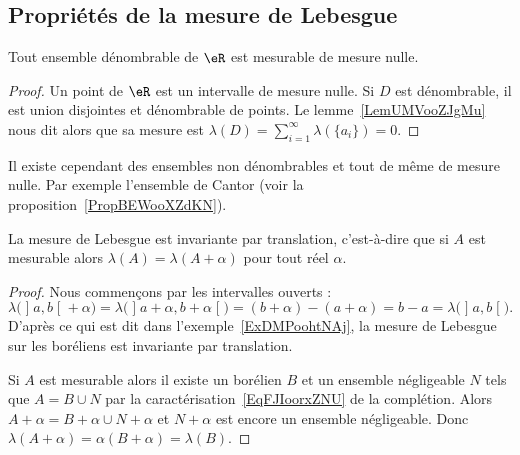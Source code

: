\subsection{Propriétés de la mesure de Lebesgue}

\begin{proposition}
    Tout ensemble dénombrable de \( \eR\) est mesurable de mesure nulle.
\end{proposition}

\begin{proof}
    Un point de \( \eR\) est un intervalle de mesure nulle. Si \( D\) est dénombrable, il est union disjointes et dénombrable de points. Le lemme~\ref{LemUMVooZJgMu} nous dit alors que sa mesure est \( \lambda(D)=\sum_{i=1}^{\infty}\lambda(\{ a_i \})=0\).
\end{proof}

\begin{remark}
    Il existe cependant des ensembles non dénombrables et tout de même de mesure nulle. Par exemple l'ensemble de Cantor (voir la proposition~\ref{PropBEWooXZdKN}).
\end{remark}


\begin{proposition}     \label{PropooOACLooLMIUuY}
    La mesure de Lebesgue est invariante par translation, c'est-à-dire que si \( A\) est mesurable alors \( \lambda(A)=\lambda(A+\alpha)\) pour tout réel \( \alpha\).
\end{proposition}

\begin{proof}
    Nous commençons par les intervalles ouverts :
    \begin{equation}
    \lambda\big( \mathopen] a , b \mathclose[+\alpha \big)=\lambda\big( \mathopen] a+\alpha , b+\alpha \mathclose[ \big)=(b+\alpha)-(a+\alpha)=b-a=\lambda\big( \mathopen] a , b \mathclose[ \big).
    \end{equation}
    D'après ce qui est dit dans l'exemple~\ref{ExDMPoohtNAj}, la mesure de Lebesgue sur les boréliens est invariante par translation.

    Si \( A\) est mesurable alors il existe un borélien \( B\) et un ensemble négligeable \( N\) tels que \( A=B\cup N\) par la caractérisation~\ref{EqFJIoorxZNU} de la complétion. Alors \( A+\alpha=B+\alpha\cup N+\alpha\) et \( N+\alpha\) est encore un ensemble négligeable. Donc \( \lambda(A+\alpha)=\alpha(B+\alpha)=\lambda(B)\).
\end{proof}

